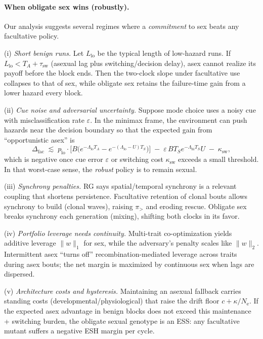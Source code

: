 \documentclass[11pt]{article}
\theoremstyle{upright}
\newcommand{\Ne}{N_{\mathrm{e}}}
\begin{document}
\paragraph{When obligate sex wins (robustly).}
Our analysis suggests several regimes where a \emph{commitment} to sex beats any facultative policy.

(i) \emph{Short benign runs.} Let $L_{\mathrm{lo}}$ be the typical length of low-hazard runs. If $L_{\mathrm{lo}}<T_A+\tau_{\mathrm{sw}}$ (asexual lag plus switching/decision delay), asex cannot realize its payoff before the block ends. Then the two-clock slope under facultative use collapses to that of sex, while obligate sex retains the failure-time gain from a lower hazard every block.

(ii) \emph{Cue noise and adversarial uncertainty.} Suppose mode choice uses a noisy cue with misclassification rate $\varepsilon$. In the minimax frame, the environment can push hazards near the decision boundary so that the expected gain from “opportunistic asex” is
\[
\Delta_{\mathrm{fac}} \;\lesssim\; p_{\mathrm{lo}}\!\cdot\!\Big[B\!\big(e^{-\Lambda_{\mathrm{lo}} T_A}-e^{-(\Lambda_{\mathrm{lo}}-U)T_S}\big)\Big] \;-\; \varepsilon\,B T_S e^{-\Lambda_{\mathrm{hi}} T_S}U \;-\; \kappa_{\mathrm{sw}},
\]
which is negative once cue error $\varepsilon$ or switching cost $\kappa_{\mathrm{sw}}$ exceeds a small threshold. In that worst-case sense, the \emph{robust} policy is to remain sexual.

(iii) \emph{Synchrony penalties.} RG says spatial/temporal synchrony is a relevant coupling that shortens persistence. Facultative retention of clonal bouts allows synchrony to build (clonal waves), raising $\pi_{>}$ and eroding rescue. Obligate sex breaks synchrony each generation (mixing), shifting both clocks in its favor.

(iv) \emph{Portfolio leverage needs continuity.} Multi-trait co-optimization yields additive leverage $\|w\|_1$ for sex, while the adversary’s penalty scales like $\|w\|_2$. Intermittent asex “turns off” recombination-mediated leverage across traits during asex bouts; the net margin is maximized by continuous sex when lags are dispersed.

(v) \emph{Architecture costs and hysteresis.} Maintaining an asexual fallback carries standing costs (developmental/physiological) that raise the drift floor $c+\kappa/\Ne$. If the expected asex advantage in benign blocks does not exceed this maintenance + switching burden, the obligate sexual genotype is an ESS: any facultative mutant suffers a negative ESH margin per cycle.
\end{document}
